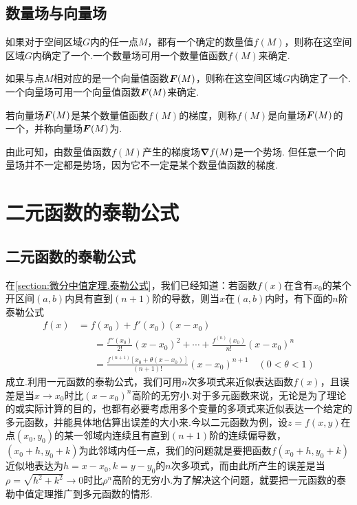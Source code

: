 \subsection{数量场与向量场}
\begin{definition}
如果对于空间区域\(G\)内的任一点\(M\)，都有一个确定的数量值\(f(M)\)，则称在这空间区域\(G\)内确定了一个.一个数量场可用一个数量值函数\(f(M)\)来确定.

如果与点\(M\)相对应的是一个向量值函数\(\boldsymbol{F}(M)\)，则称在这空间区域\(G\)内确定了一个.一个向量场可用一个向量值函数\(\boldsymbol{F}(M)\)来确定.

若向量场\(\boldsymbol{F}(M)\)是某个数量值函数\(f(M)\)的梯度，则称\(f(M)\)是向量场\(\boldsymbol{F}(M)\)的一个，并称向量场\(\boldsymbol{F}(M)\)为.
\end{definition}
由此可知，由数量值函数\(f(M)\)产生的梯度场\(\grad{f}(M)\)是一个势场.
但任意一个向量场并不一定都是势场，因为它不一定是某个数量值函数的梯度.

\section{二元函数的泰勒公式}
\subsection{二元函数的泰勒公式}
在\cref{section:微分中值定理.泰勒公式}，我们已经知道：若函数\(f(x)\)在含有\(x_0\)的某个开区间\((a,b)\)内具有直到\((n+1)\)阶的导数，则当\(x\)在\((a,b)\)内时，有下面的\(n\)阶泰勒公式\begin{align*}
f(x) &= f(x_0) + f'(x_0) (x-x_0) \\
&\hspace{20pt}=\frac{f''(x_0)}{2!} (x-x_0)^2 + \dotsb + \frac{f^{(n)}(x_0)}{n!} (x-x_0)^n \\
&\hspace{20pt}=\frac{f^{(n+1)}[x_0+\theta(x-x_0)]}{(n+1)!} (x-x_0)^{n+1}
\quad(0<\theta<1)
\end{align*}成立.利用一元函数的泰勒公式，我们可用\(n\)次多项式来近似表达函数\(f(x)\)，且误差是当\(x \to x_0\)时比\((x-x_0)^n\)高阶的无穷小.对于多元函数来说，无论是为了理论的或实际计算的目的，也都有必要考虑用多个变量的多项式来近似表达一个给定的多元函数，并能具体地估算出误差的大小来.今以二元函数为例，设\(z=f(x,y)\)在点\((x_0,y_0)\)的某一邻域内连续且有直到\((n+1)\)阶的连续偏导数，\((x_0+h,y_0+k)\)为此邻域内任一点，我们的问题就是要把函数\(f(x_0+h,y_0+k)\)近似地表达为\(h=x-x_0,k=y-y_0\)的\(n\)次多项式，而由此所产生的误差是当\(\rho=\sqrt{h^2+k^2}\to0\)时比\(\rho^n\)高阶的无穷小.为了解决这个问题，就要把一元函数的泰勒中值定理推广到多元函数的情形.

